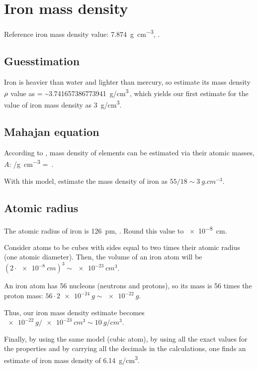 \chapter*{Iron mass density}
%
Reference iron mass density value: \SI{7.874}{g.cm^{-3}}, \citep{wiki:iron}.


\section*{Guesstimation}
%
Iron is heavier than water and lighter than mercury, so estimate its mass density $\rho$ value as
%
\beq
    \dens = 
          \sim\SI{3.741657386773941}{g/cm^3}\,,
\eeq
%
which yields our first estimate for the value of iron mass density as \SI{3}{g/cm^3}.


\section*{Mahajan equation}
%
According to \citep[p. 57]{sanjoy:2008}, mass density of elements can be estimated via their atomic masses, $A$:
%
\beq
    \dens/\si{g.cm^{-3}} = \,.
\eeq

With this model, estimate the mass density of iron as $55/18 \sim \SI{3}{g.cm^{-3}}$.


\section*{Atomic radius}
%
The atomic radius of iron is \SI{126}{pm}, \citep{wiki:iron}. Round this value to \SI{e-8}{cm}.

Consider atoms to be cubes with sides equal to two times their atomic radius (one atomic diameter). Then, the volume of an iron atom will be $\left(2\cdot\SI{e-8}{cm}\right)^3\sim\SI{e-23}{cm^3}$. 

An iron atom has 56 nucleons (neutrons and protons), so its mass is 56 times the proton mass: $56\cdot\SI{2e-24}{g}\sim\SI{e-22}{g}$.

Thus, our iron mass density estimate becomes $\SI{e-22}{g}/\SI{e-23}{cm^3}\sim\SI{10}{g/cm^3}$.

Finally, by using the same model (cubic atom), by using all the exact values for the properties and by carrying all the decimals in the calculations, one finds an estimate of iron mass density of \SI{6.14}{g/cm^3}.
